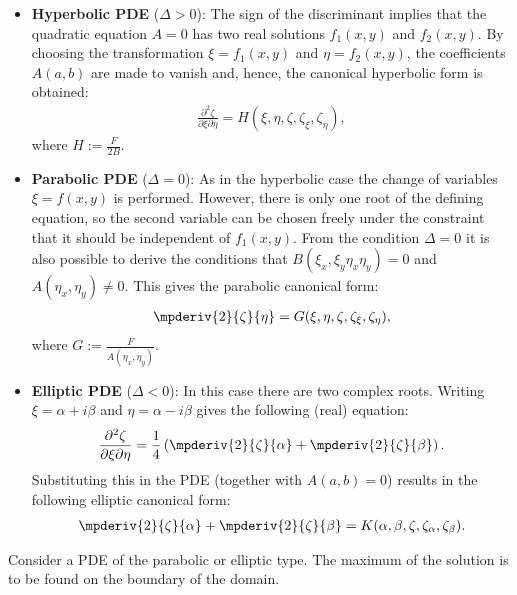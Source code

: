 {        \begin{itemize}
            \item\textbf{Hyperbolic PDE} ($\Delta>0$): The sign of the discriminant implies that the quadratic equation $A=0$ has two real solutions $f_1(x,y)$ and $f_2(x,y)$. By choosing the transformation $\xi=f_1(x,y)$ and $\eta=f_2(x,y)$, the coefficients $A(a,b)$ are made to vanish and, hence, the canonical hyperbolic form is obtained:
                \begin{gather}
                    \label{pde:hyperbolic_canonical_form}
                    \frac{\partial^2\zeta}{\partial\xi\partial\eta} = H(\xi,\eta,\zeta,\zeta_\xi,\zeta_\eta),
                \end{gather}
                where $H := \frac{F}{2B}$.
            \item\textbf{Parabolic PDE} ($\Delta=0$): As in the hyperbolic case the change of variables $\xi = f(x,y)$ is performed. However, there is only one root of the defining equation, so the second variable can be chosen freely under the constraint that it should be independent of $f_1(x,y)$. From the condition $\Delta=0$ it is also possible to derive the conditions that $B(\xi_x,\xi_y\eta_x\eta_y) = 0$ and $A(\eta_x,\eta_y)\neq0$. This gives the parabolic canonical form:
                \begin{gather}
                    \label{pde:parabolic_canonical_form}
                    \mpderiv{2}{\zeta}{\eta} = G(\xi,\eta,\zeta,\zeta_\xi,\zeta_\eta),
                \end{gather}
                where $G := \frac{F}{A(\eta_x,\eta_y)}$.
            \item\textbf{Elliptic PDE} ($\Delta<0$): In this case there are two complex roots. Writing $\xi = \alpha + i\beta$ and $\eta = \alpha - i\beta$ gives the following (real) equation: \[\frac{\partial^2\zeta}{\partial\xi\partial\eta} = \frac{1}{4}\left(\mpderiv{2}{\zeta}{\alpha} + \mpderiv{2}{\zeta}{\beta}\right).\] Substituting this in the PDE (together with $A(a,b)=0$) results in the following elliptic canonical form:
                \begin{gather}
                    \label{pde:elliptic_canonical_form}
                    \mpderiv{2}{\zeta}{\alpha} + \mpderiv{2}{\zeta}{\beta} = K(\alpha,\beta,\zeta,\zeta_\alpha,\zeta_\beta).
                \end{gather}
        \end{itemize}
    }

    \begin{theorem}\label{pde:maximum_principle}
        Consider a PDE of the parabolic or elliptic type. The maximum of the solution is to be found on the boundary of the domain.
    \end{theorem}

